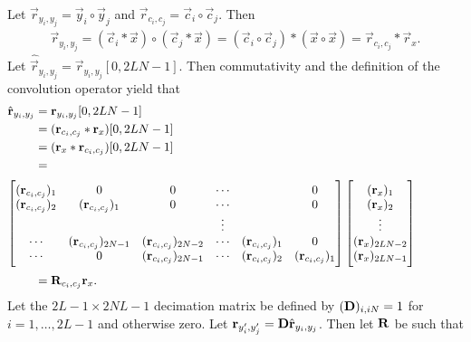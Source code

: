 \documentclass[a4paper, openany, oneside]{memoir}
\begin{document}
Let $\vec{r}_{y_i,y_j} = \vec{y}_i \circ \vec{y}_j$ and $\vec{r}_{c_i,c_j} = \vec{c}_i \circ \vec{c}_j$. Then
\begin{align*}
    \vec{r}_{y_i,y_j} =(\vec{c}_i \ast \vec{x}) \circ (\vec{c}_j \ast \vec{x}) = (\vec{c}_i \circ \vec{c}_j) \ast (\vec{x} \circ \vec{x}) = \vec{r}_{c_i,c_j} \ast \vec{r}_x.
\end{align*}
Let $\hat{\vec{r}}_{y_i,y_j} = \vec{r}_{y_i,y_j}[0,2LN-1]$. Then commutativity and the definition of the convolution operator yield that
\begin{align*}
    \hat{\vec{r}}_{y_i,y_j}
    &= \vec{r}_{y_i,y_j}[0,2LN-1] \\
    &= (\vec{r}_{c_i,c_j} \ast \vec{r}_x)[0,2LN-1] \\
    &= (\vec{r}_x \ast \vec{r}_{c_i,c_j})[0,2LN-1] \\
    &= \hskip \textwidth minus \textwidth \\ %
    \intertext{$\begin{bmatrix}
        (\vec{r}_{c_i,c_j})_1 & 0 & 0& \cdots & &  0 \\
        (\vec{r}_{c_i,c_j})_2 & (\vec{r}_{c_i,c_j})_1 & 0 & \cdots & & 0 \\
        &  & & \vdots &  & \\
        \cdots & (\vec{r}_{c_i,c_j})_{2N-1} & (\vec{r}_{c_i,c_j})_{2N-2} & \cdots & (\vec{r}_{c_i,c_j})_1 & 0 \\
        \cdots & 0 & (\vec{r}_{c_i,c_j})_{2N-1} & \cdots & (\vec{r}_{c_i,c_j})_2 & (\vec{r}_{c_i,c_j})_1 \\
    \end{bmatrix}
    \begin{bmatrix}
        (\vec{r}_x)_1 \\
        (\vec{r}_x)_2 \\
        \vdots \\
        (\vec{r}_x)_{2LN-2} \\
        (\vec{r}_x)_{2LN-1}
    \end{bmatrix}$}
    &= \mat{R}_{c_i,c_j} \vec{r}_x.
\end{align*}
Let the $2L-1\times 2NL-1$ decimation matrix be defined by $(\boldsymbol{\mathbf{D}})_{i,iN} = 1$ for $i=1,\ldots,2L-1$ and otherwise zero. Let $\boldsymbol{\mathbf{r}}_{y'_i,y'_j} = \boldsymbol{\mathbf{D}} \hat{\boldsymbol{\mathbf{r}}}_{y_i,y_j}$. Then let $\boldsymbol{\mathbf{R}}$ be such that
\end{document}
